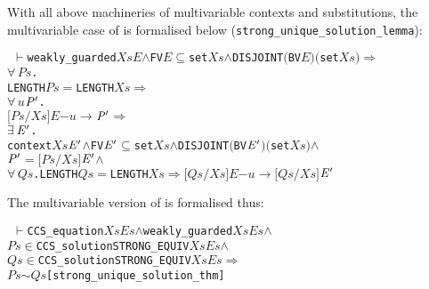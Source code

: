 \documentclass[GCNS]{yincog}
\renewcommand{\HOLConst}[1]{\texttt{#1}}
\renewcommand{\HOLBoundVar}[1]{\ensuremath{\mathit{#1}}}
\renewcommand{\HOLFreeVar}[1]{\ensuremath{\mathit{#1}}}
\renewcommand{\HOLSymConst}[1]{#1}
\renewcommand{\HOLTokenConj}{\ensuremath{\wedge}}
\renewcommand{\HOLTokenIn}{\ensuremath{\in}}
\renewcommand{\HOLTokenSubset}{\ensuremath{\subseteq}}
\renewcommand{\HOLTokenExists}{\ensuremath{\exists \,}}
\renewcommand{\HOLTokenForall}{\ensuremath{\forall \,}}
\renewcommand{\HOLTokenTurnstile}{\ensuremath{\:\:\vdash}}
\theoremstyle{remark}
\theoremstyle{theorem}
\theoremstyle{remark}
\newcommand{\HOLTokenStrongEQ}{$\sim$}
\newcommand{\HOLTokenTransBegin}{$-$}
\newcommand{\HOLTokenTransEnd}{$\rightarrow$\xspace}
\renewcommand{\HOLTokenImp}{\ensuremath{\Longrightarrow}}
\newcommand{\multivariate}{multivariable\xspace}
\begin{document}
With all above machineries of \multivariate contexts and substitutions,
the \multivariate case of  is formalised below
(\texttt{strong\_unique\_solution\_lemma}):
%
\begin{alltt}
\HOLTokenTurnstile{} \HOLConst{weakly\_guarded} \HOLFreeVar{Xs} \HOLFreeVar{E} \HOLSymConst{\HOLTokenConj{}} \HOLConst{FV} \HOLFreeVar{E} \HOLSymConst{\HOLTokenSubset{}} \HOLConst{set} \HOLFreeVar{Xs} \HOLSymConst{\HOLTokenConj{}} \HOLConst{DISJOINT} \ensuremath{(}\HOLConst{BV} \HOLFreeVar{E}\ensuremath{)} \ensuremath{(}\HOLConst{set} \HOLFreeVar{Xs}\ensuremath{)} \HOLSymConst{\HOLTokenImp{}}
   \HOLSymConst{\HOLTokenForall{}}\HOLBoundVar{Ps}.
       \HOLConst{LENGTH} \HOLBoundVar{Ps} \HOLSymConst{\ensuremath{=}} \HOLConst{LENGTH} \HOLFreeVar{Xs} \HOLSymConst{\HOLTokenImp{}}
       \HOLSymConst{\HOLTokenForall{}}\HOLBoundVar{u} \ensuremath{\HOLBoundVar{P}\sp{\prime}}.
           \ensuremath{[}\HOLBoundVar{Ps}\ensuremath{/}\HOLFreeVar{Xs}\ensuremath{]} \HOLFreeVar{E} \HOLTokenTransBegin\HOLBoundVar{u}\HOLTokenTransEnd \ensuremath{\HOLBoundVar{P}\sp{\prime}} \HOLSymConst{\HOLTokenImp{}}
           \HOLSymConst{\HOLTokenExists{}}\ensuremath{\HOLBoundVar{E}\sp{\prime}}.
               \HOLConst{context} \HOLFreeVar{Xs} \ensuremath{\HOLBoundVar{E}\sp{\prime}} \HOLSymConst{\HOLTokenConj{}} \HOLConst{FV} \ensuremath{\HOLBoundVar{E}\sp{\prime}} \HOLSymConst{\HOLTokenSubset{}} \HOLConst{set} \HOLFreeVar{Xs} \HOLSymConst{\HOLTokenConj{}} \HOLConst{DISJOINT} \ensuremath{(}\HOLConst{BV} \ensuremath{\HOLBoundVar{E}\sp{\prime}}\ensuremath{)} \ensuremath{(}\HOLConst{set} \HOLFreeVar{Xs}\ensuremath{)} \HOLSymConst{\HOLTokenConj{}}
               \ensuremath{\HOLBoundVar{P}\sp{\prime}} \HOLSymConst{\ensuremath{=}} \ensuremath{[}\HOLBoundVar{Ps}\ensuremath{/}\HOLFreeVar{Xs}\ensuremath{]} \ensuremath{\HOLBoundVar{E}\sp{\prime}} \HOLSymConst{\HOLTokenConj{}}
               \HOLSymConst{\HOLTokenForall{}}\HOLBoundVar{Qs}. \HOLConst{LENGTH} \HOLBoundVar{Qs} \HOLSymConst{\ensuremath{=}} \HOLConst{LENGTH} \HOLFreeVar{Xs} \HOLSymConst{\HOLTokenImp{}} \ensuremath{[}\HOLBoundVar{Qs}\ensuremath{/}\HOLFreeVar{Xs}\ensuremath{]} \HOLFreeVar{E} \HOLTokenTransBegin\HOLBoundVar{u}\HOLTokenTransEnd \ensuremath{[}\HOLBoundVar{Qs}\ensuremath{/}\HOLFreeVar{Xs}\ensuremath{]} \ensuremath{\HOLBoundVar{E}\sp{\prime}}
\end{alltt}

The \multivariate version of  is formalised thus:
%
\begin{alltt}
\HOLTokenTurnstile{} \HOLConst{CCS\_equation} \HOLFreeVar{Xs} \HOLFreeVar{Es} \HOLSymConst{\HOLTokenConj{}} \HOLConst{weakly\_guarded} \HOLFreeVar{Xs} \HOLFreeVar{Es} \HOLSymConst{\HOLTokenConj{}}
   \HOLFreeVar{Ps} \HOLSymConst{\HOLTokenIn{}} \HOLConst{CCS\_solution} \HOLConst{STRONG\_EQUIV} \HOLFreeVar{Xs} \HOLFreeVar{Es} \HOLSymConst{\HOLTokenConj{}}
   \HOLFreeVar{Qs} \HOLSymConst{\HOLTokenIn{}} \HOLConst{CCS\_solution} \HOLConst{STRONG\_EQUIV} \HOLFreeVar{Xs} \HOLFreeVar{Es} \HOLSymConst{\HOLTokenImp{}}
   \HOLFreeVar{Ps} \HOLSymConst{\HOLTokenStrongEQ} \HOLFreeVar{Qs}\hfill{[strong\_unique\_solution\_thm]}
\end{alltt}
\end{document}
